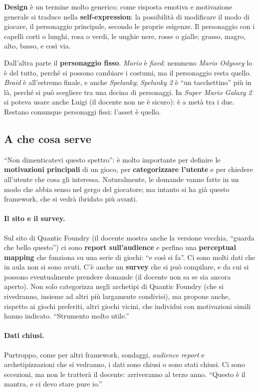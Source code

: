 \textbf{Design} è un termine molto generico; come risposta emotiva e
motivazione generale si traduce nella \textbf{self-expression}: la
possibilità di modificare il modo di giocare, il personaggio principale,
secondo le proprie esigenze. Il personaggio con i capelli corti o lunghi,
rosa o verdi, le unghie nere, rosse o gialle; grasso, magro, alto, basso, e
così via.

Dall'altra parte il \textbf{personaggio fisso}. \emph{Mario} è \emph{fixed}:
nemmeno \emph{Mario Odyssey} lo è del tutto, perché si possono cambiare i
costumi, ma il personaggio resta quello. \emph{Braid} è all'estremo finale,
e anche \emph{Spelunky}; \emph{Spelunky 2} è ``un tacchettino'' più in là,
perché si può scegliere tra una decina di personaggi. In \emph{Super Mario
Galaxy 2} si poteva usare anche Luigi (il docente non ne è sicuro): è a metà
tra i due. Restano comunque personaggi fissi: l'asset è quello.

\subsection{A che cosa serve}

``Non dimenticatevi questo spettro'': è molto importante per definire le
\textbf{motivazioni principali} di un gioco, per \textbf{categorizzare
l'utente} e per chiedere all'utente che cosa gli interessa. Naturalmente,
le domande vanno fatte in un modo che abbia senso nel gergo del giocatore;
ma intanto si ha già questo framework, che si vedrà ibridato più avanti.

\paragraph{Il sito e il survey.} Sul sito di Quantic Foundry (il docente
mostra anche la versione vecchia, ``guarda che bello questo'') ci sono
\textbf{report sull'audience} e perfino una \textbf{perceptual mapping} che
funziona su una serie di giochi: ``e così si fa''. Ci sono molti dati che in
aula non si sono avuti. C'è anche un \textbf{survey} che si può compilare, e
da cui si possono eventualmente prendere domande (il docente non sa se sia
ancora aperto). Non solo categorizza negli archetipi di Quantic Foundry (che si
rivedranno, insieme ad altri più largamente condivisi), ma propone anche,
rispetto ai giochi preferiti, altri giochi vicini, che individui con
motivazioni simili hanno indicato. ``Strumento molto utile.''

\paragraph{Dati chiusi.} Purtroppo, come per altri framework, sondaggi,
\emph{audience report} e archetipizzazioni che si vedranno, i dati sono chiusi
o sono stati chiusi. Ci sono eccezioni, ma non le tratterà il docente:
arriveranno al terzo anno. ``Questo è il mantra, e ci devo stare pure io.''

